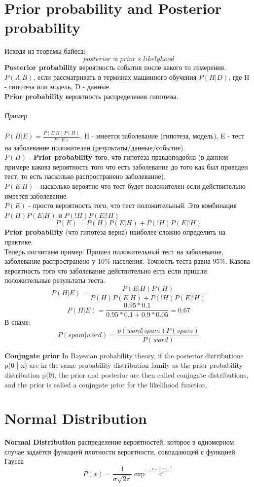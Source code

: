 \documentclass{book}
\begin{document}
\section{Prior probability and Posterior probability}
Исходя из теоремы байеса: $$posterior\propto prior \times likelyhood$$
\textbf{Posterior probability} вероятность события после какого то измерения. $P(A|B)$, если рассматривать в терминах машинного обучения $P(H|D)$, где H - гипотеза или модель, D - данные.\\
\textbf{Prior probability} вероятность распределения гипотезы.\\\\
\emph{Пример}\\\\
$ P(H|E) = \frac{P(E|H)P(H)}{P(E)} $, H - имеется заболевание (гипотеза, модель), E - тест на заболевание положителен (результаты/данные/событие).\\ $P(H)$ - \textbf{Prior probability} того, что гипотеза правдоподобна (в данном примере какова вероятность того что есть заболевание до того как был проведен тест, то есть насколько распространено заболевание).\\ $P(E|H)$ - насколько вероятно что тест будет положителен если действительно имеется заболевание.\\$P(E)$ - просто вероятность того, что тест положительный. Это комбинация  $P(H)P(E|H)$ и $P(!H)P(E|!H)$ $$ P(E)= P(H)P(E|H) + P(!H)P(E|!H)$$
\textbf{Prior probability} (что гипотеза верна) наиболее сложно определить на практике.\\
Теперь посчитаем пример:
Пришел положительный тест на заболевание, заболевание распространено у 10\% населения. Точность теста равна 95\%. Какова вероятность того что заболевание действительно есть если пришли положительные результаты теста.
$$P(H|E)=\frac{P(E|H)P(H)}{P(H)P(E|H) + P(!H)P(E|!H)}$$$$P(H|E)=\frac{0.95*0.1}{0.95*0.1+0.9*0.05}=0.67$$
В спаме:$$P(spam|word)=\frac{p(word|spam)P(spam)}{P(word)}$$

\textbf{Conjugate prior} 
In Bayesian probability theory, if the posterior distributions p(θ | x) are in the same probability distribution family as the prior probability distribution p(θ), the prior and posterior are then called conjugate distributions, and the prior is called a conjugate prior for the likelihood function.
\section{Normal Distribution}
\textbf{Normal Distribution}
 распределение вероятностей, которое в одномерном случае задаётся функцией плотности вероятности, совпадающей с функцией Гаусса
 $$P(x)=\frac{1}{\sigma\sqrt{2\pi}}\exp^{-\frac{(x-E[x])^2}{2\sigma^2}}$$
\end{document}
